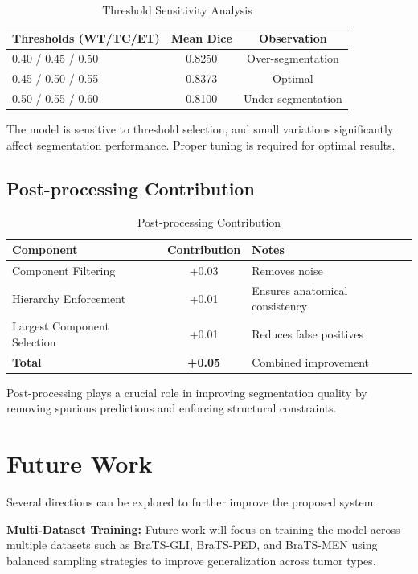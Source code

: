 \documentclass[conference]{IEEEtran}
\begin{document}
\begin{table}[htbp]
\centering
\caption{Threshold Sensitivity Analysis}
\begin{tabular}{|l|c|c|}
\hline
\textbf{Thresholds (WT/TC/ET)} & \textbf{Mean Dice} & \textbf{Observation} \\
\hline
0.40 / 0.45 / 0.50 & 0.8250 & Over-segmentation \\
0.45 / 0.50 / 0.55 & 0.8373 & Optimal \\
0.50 / 0.55 / 0.60 & 0.8100 & Under-segmentation \\
\hline
\end{tabular}
\end{table}

The model is sensitive to threshold selection, and small variations significantly affect segmentation performance. Proper tuning is required for optimal results.

\subsection{Post-processing Contribution}

\begin{table}[htbp]
\centering
\caption{Post-processing Contribution}
\label{tab:postproc}
\begin{tabular}{|p{2cm}|c|p{3cm}|}
\hline
\textbf{Component} & \textbf{Contribution} & \textbf{Notes} \\
\hline
Component Filtering & +0.03 & Removes noise \\
Hierarchy Enforcement & +0.01 & Ensures anatomical consistency \\
Largest Component Selection & +0.01 & Reduces false positives \\
\hline
\textbf{Total} & \textbf{+0.05} & Combined improvement \\
\hline
\end{tabular}
\end{table}

Post-processing plays a crucial role in improving segmentation quality by removing spurious predictions and enforcing structural constraints.

\section{Future Work}

Several directions can be explored to further improve the proposed system.

\textbf{Multi-Dataset Training:}  
Future work will focus on training the model across multiple datasets such as BraTS-GLI, BraTS-PED, and BraTS-MEN using balanced sampling strategies to improve generalization across tumor types.
\end{document}
